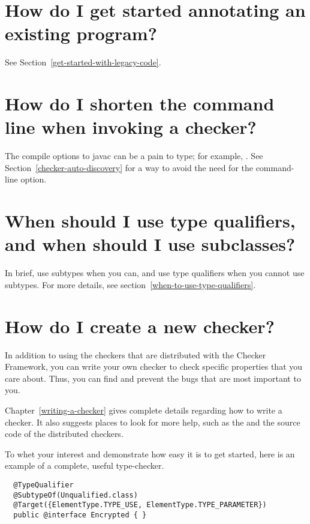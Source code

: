 \section{How do I get started annotating an existing program?\label{faq-annotate-existing-program}}

See Section~\ref{get-started-with-legacy-code}.


\section{How do I shorten the command line when invoking a checker?\label{faq-shorten-command-line}}

The compile options to javac can be a pain to type; for example,
.
See Section~\ref{checker-auto-discovery} for a way to avoid the need for
the  command-line option.


\section{When should I use type qualifiers, and when should I use subclasses?\label{faq-qualifiers-vs-subclasses}}

In brief, use subtypes when you can, and use type qualifiers when you cannot
use subtypes.
For more details, see section~\ref{when-to-use-type-qualifiers}.


\section{How do I create a new checker?\label{faq-create-a-checker}}

In addition to using the checkers that are distributed with the Checker
Framework, you can write your own checker to check specific properties that
you care about.  Thus, you can find and prevent the bugs that are most
important to you.

Chapter~\ref{writing-a-checker} gives
complete details regarding how to write a checker.  It also suggests places
to look for more help, such as the  and the source code of the distributed
checkers.

To whet your interest and demonstrate how easy it is to get started, here
is an example of a complete, useful type-checker.

\begin{Verbatim}
  @TypeQualifier
  @SubtypeOf(Unqualified.class)
  @Target({ElementType.TYPE_USE, ElementType.TYPE_PARAMETER})
  public @interface Encrypted { }
\end{Verbatim}


